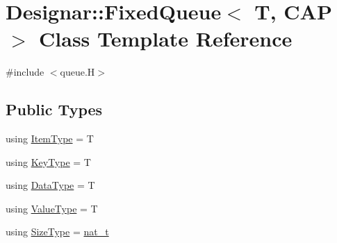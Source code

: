 \hypertarget{class_designar_1_1_fixed_queue}{}\section{Designar\+:\+:Fixed\+Queue$<$ T, C\+AP $>$ Class Template Reference}
\label{class_designar_1_1_fixed_queue}


{\ttfamily \#include $<$queue.\+H$>$}

\subsection*{Public Types}
\begin{DoxyCompactItemize}
\item 
using \hyperlink{class_designar_1_1_fixed_queue_aa1c356bc74a041121662af027abf279b}{Item\+Type} = T
\item 
using \hyperlink{class_designar_1_1_fixed_queue_a37999fa3f2fa0aacaf67d94e6da50f3d}{Key\+Type} = T
\item 
using \hyperlink{class_designar_1_1_fixed_queue_a0638afcff4eb29040d4573212558da5f}{Data\+Type} = T
\item 
using \hyperlink{class_designar_1_1_fixed_queue_a3507ad9a592d5ade2c7cfe0b9484a4b0}{Value\+Type} = T
\item 
using \hyperlink{class_designar_1_1_fixed_queue_a900c2a6d70517602bd8bc9dc7894c104}{Size\+Type} = \hyperlink{namespace_designar_aa72662848b9f4815e7bf31a7cf3e33d1}{nat\+\_\+t}
\end{DoxyCompactItemize}
